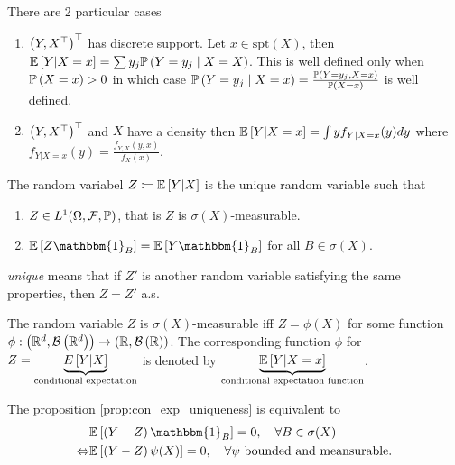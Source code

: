 There are 2 particular cases
\begin{enumerate}
    \item $\left(Y,X^\top\right)^\top$ has discrete support. Let $x\in \text{spt}(X)$, then $\mathbb{E}\left[Y|X=x\right]=\sum y_j \mathbb{P}\left(Y=y_j\mid X=X\right)$. This is well defined only when $\mathbb{P}\left(X=x\right)>0$ in which case $\mathbb{P}\left(Y=y_j\mid X=x\right)=\frac{\mathbb{P}\left(Y=y_j,X=x\right)}{\mathbb{P}\left(X=x\right)}$ is well defined.
    \item $\left(Y,X^\top\right)^\top$ and $X$ have a density then $\mathbb{E}\left[Y|X=x\right]=\int yf_{Y|X=x}(y)dy$ where $f_{Y|X=x}(y)=\frac{f_{Y,X}(y,x)}{f_X(x)}$.
\end{enumerate}
\begin{proposition}
    The random variabel $Z \coloneqq \mathbb{E}\left[Y|X\right]$ is the unique random variable such that
    \begin{enumerate}
        \item $Z\in L^1(\Omega, \mathcal{F}, \mathbb{P})$, that is $Z$ is $\sigma(X)$-measurable.
        \item \label{prop:con_exp_uniqueness}$\E\bra{Z\mathbbm{1}_B}=\E\bra{Y\mathbbm{1}_B}$ for all $B\in \sigma(X)$.
    \end{enumerate}
    \emph{unique} means that if $Z'$ is another random variable satisfying the same properties, then $Z=Z'$ a.s.
\end{proposition}
\begin{remark}
    The random variable $Z$ is $\sigma(X)$-measurable iff $Z=\phi(X)$ for some function $\phi:\left(\mathbb{R}^d,\mathcal{B}\left(\mathbb{R}^d\right)\right)\to\left(\mathbb{R},\mathcal{B}\left(\mathbb{R}\right)\right)$. The corresponding function $\phi$ for $Z=\underbrace{E\left[Y|X\right]}_{\text{conditional expectation}}$ is denoted by $\underbrace{\mathbb{E}\left[Y|X=x\right]}_\text{conditional expectation function}$.
\end{remark}
\begin{remark}
    The proposition \ref{prop:con_exp_uniqueness} is equivalent to 
    \begin{align*}
        &\E\bra{\pa{Y-Z}\mathbbm{1}_B}=0, \quad \forall B\in \sigma(X) \\ \Leftrightarrow &\E\bra{\pa{Y-Z}\psi(X)}=0, \quad \forall \psi\ \text{bounded and meansurable}.
    \end{align*}
\end{remark}

